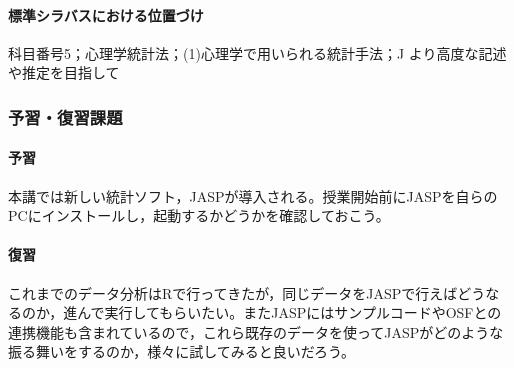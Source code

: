 \paragraph{標準シラバスにおける位置づけ}
科目番号5；心理学統計法；(1)心理学で用いられる統計手法；J より高度な記述や推定を目指して
\subsubsection{予習・復習課題}
\paragraph{予習}本講では新しい統計ソフト，JASPが導入される。授業開始前にJASPを自らのPCにインストールし，起動するかどうかを確認しておこう。
\paragraph{復習}これまでのデータ分析はRで行ってきたが，同じデータをJASPで行えばどうなるのか，進んで実行してもらいたい。またJASPにはサンプルコードやOSFとの連携機能も含まれているので，これら既存のデータを使ってJASPがどのような振る舞いをするのか，様々に試してみると良いだろう。
